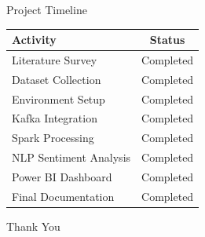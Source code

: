 \documentclass[aspectratio=169]{beamer}
\newcommand{\done}{\textcolor{green}{\ding{51}}} %
\begin{document}
\begin{frame}{Project Timeline}
\centering
\begin{tabular}{|l|c|}
\hline
\textbf{Activity} & \textbf{Status} \\
\hline
Literature Survey & \done Completed \\
Dataset Collection & \done Completed \\
Environment Setup & \done Completed \\
Kafka Integration & \done Completed \\
Spark Processing & \done Completed \\
NLP Sentiment Analysis & \done Completed \\
Power BI Dashboard & \done Completed \\
Final Documentation & \done Completed \\
\hline
\end{tabular}
\end{frame}

\begin{frame}
\centering
\Huge Thank You
\end{frame}
\end{document}
